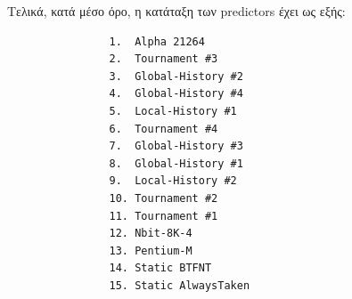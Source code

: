 \documentclass[12pt,a4paper]{article}
\begin{document}
			Τελικά, κατά μέσο όρο, η κατάταξη των predictors έχει ως εξής:
			
			\begin{verbatim}
				1.  Alpha 21264
				2.  Tournament #3
				3.  Global-History #2
				4.  Global-History #4
				5.  Local-History #1
				6.  Tournament #4
				7.  Global-History #3
				8.  Global-History #1
				9.  Local-History #2
				10. Tournament #2
				11. Tournament #1
				12. Nbit-8K-4
				13. Pentium-M
				14. Static BTFNT
				15. Static AlwaysTaken
			\end{verbatim}
	
\end{document}
